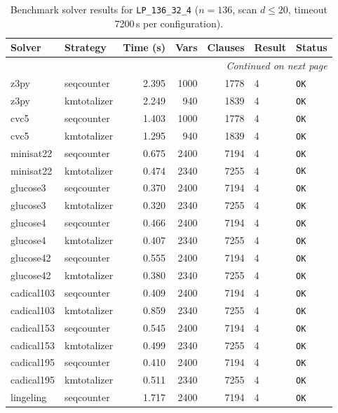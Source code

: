 \begin{longtable}{llrrrl p{}}
\caption{Benchmark solver results for \texttt{LP\_136\_32\_4} ($n=136$, scan $d \leq 20$, timeout 7200\,s per configuration).} \label{tab:bench-LP_136_32_4} \\
\toprule
Solver & Strategy & Time (s) & Vars & Clauses & Result & Status \\
\midrule
\endhead
\midrule
\multicolumn{7}{r}{\textit{Continued on next page}} \\
\midrule
\endfoot
\bottomrule
\endlastfoot
z3py & seqcounter & 2.395 & 1000 & 1778 & 4 & \texttt{OK} \\
z3py & kmtotalizer & 2.249 & 940 & 1839 & 4 & \texttt{OK} \\
cvc5 & seqcounter & 1.403 & 1000 & 1778 & 4 & \texttt{OK} \\
cvc5 & kmtotalizer & 1.295 & 940 & 1839 & 4 & \texttt{OK} \\
minisat22 & seqcounter & 0.675 & 2400 & 7194 & 4 & \texttt{OK} \\
minisat22 & kmtotalizer & 0.474 & 2340 & 7255 & 4 & \texttt{OK} \\
glucose3 & seqcounter & 0.370 & 2400 & 7194 & 4 & \texttt{OK} \\
glucose3 & kmtotalizer & 0.320 & 2340 & 7255 & 4 & \texttt{OK} \\
glucose4 & seqcounter & 0.466 & 2400 & 7194 & 4 & \texttt{OK} \\
glucose4 & kmtotalizer & 0.407 & 2340 & 7255 & 4 & \texttt{OK} \\
glucose42 & seqcounter & 0.555 & 2400 & 7194 & 4 & \texttt{OK} \\
glucose42 & kmtotalizer & 0.380 & 2340 & 7255 & 4 & \texttt{OK} \\
cadical103 & seqcounter & 0.409 & 2400 & 7194 & 4 & \texttt{OK} \\
cadical103 & kmtotalizer & 0.859 & 2340 & 7255 & 4 & \texttt{OK} \\
cadical153 & seqcounter & 0.545 & 2400 & 7194 & 4 & \texttt{OK} \\
cadical153 & kmtotalizer & 0.499 & 2340 & 7255 & 4 & \texttt{OK} \\
cadical195 & seqcounter & 0.410 & 2400 & 7194 & 4 & \texttt{OK} \\
cadical195 & kmtotalizer & 0.511 & 2340 & 7255 & 4 & \texttt{OK} \\
lingeling & seqcounter & 1.717 & 2400 & 7194 & 4 & \texttt{OK} \\

\end{longtable}
